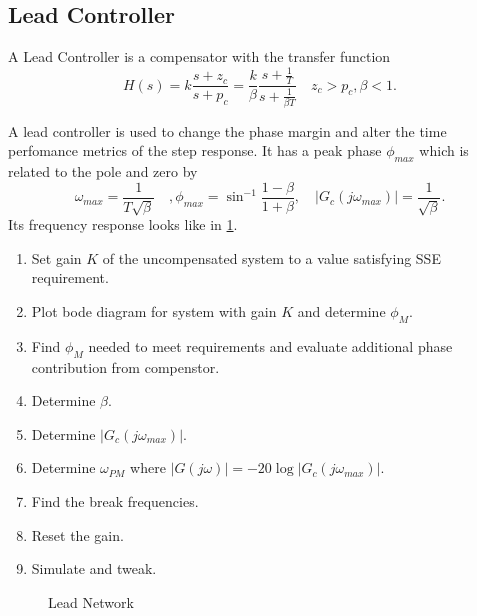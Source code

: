 \subsection{Lead Controller}
\begin{definition}
  A Lead Controller is a compensator with the transfer function
  \[
	H(s) = k\frac{s+z_c}{s+p_c} = \frac{k}{\beta}\frac{s+\frac{1}{T}}{s+\frac{1}{\beta T}} \quad z_c > p_c, \beta < 1.
  \]
  \label{defn:lead-controller}
\end{definition}
A lead controller is used to change the phase margin and alter the time perfomance metrics of the step response. It has a peak phase $\phi_{max}$ which is related to the pole and zero by
\[
  \omega_{max} = \frac{1}{T\sqrt{\beta}}\quad, \phi_{max} = \sin^{-1}\frac{1-\beta}{1+\beta}, \quad |G_c(j\omega_{max})| = \frac{1}{\sqrt{\beta}}.
\]
Its frequency response looks like in \cref{fig:lead-network}.
\begin{enumerate}
  \item Set gain $K$ of the uncompensated system to a value satisfying SSE requirement.
  \item Plot bode diagram for system with gain $K$ and determine $\phi_M$.
  \item Find $\phi_{M}$ needed to meet requirements and evaluate additional phase contribution from compenstor.
  \item Determine $\beta$.
  \item Determine $|G_c(j\omega_{max})|$.
  \item Determine $\omega_{PM}$ where $|G(j\omega)| = -20\log|G_c(j\omega_{max})|$.
  \item Find the break frequencies.
  \item Reset the gain.
  \item Simulate and tweak.
\end{enumerate}
\begin{figure}
  \centering
  \caption{Lead Network}
  \label{fig:lead-network}
\end{figure}
